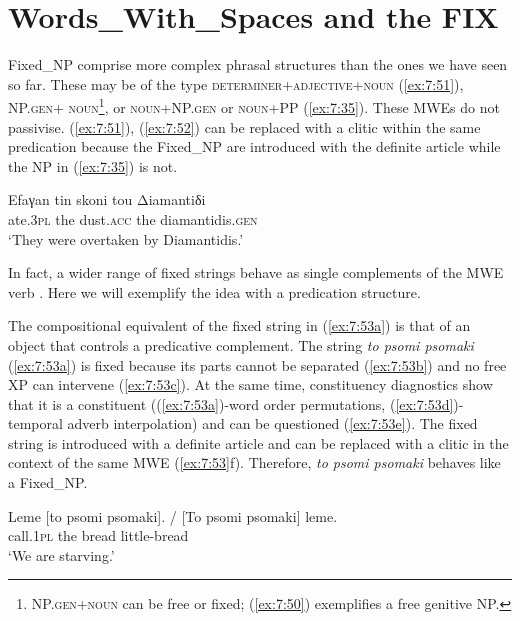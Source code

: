 \documentclass[output=paper]{langsci/langscibook}
\begin{document}
\section{Words\_With\_Spaces and the FIX}
\label{sec:6}
Fixed\_NP comprise more complex phrasal structures than the ones we have seen so far. These may  be of the type \textsc{determiner+adjective+noun}  (\ref{ex:7:51}), \textsc{NP.gen+} \textsc{noun}\footnote{\textsc{NP.gen+noun} can be free or fixed; (\ref{ex:7:50}) exemplifies a free genitive NP.}, or \textsc{noun+NP.gen} 
or \textsc{noun+PP} (\ref{ex:7:35}).  These MWEs do not passivise. (\ref{ex:7:51}), (\ref{ex:7:52}) can be replaced with a clitic within the same predication because the \linebreak Fixed\_NP are introduced with the definite article while the NP in (\ref{ex:7:35}) is not. 

\ea
\label{ex:7:52}      
\gll        Efaγan tin skoni tou Δiamantiδi\\
             ate.\textsc{3pl} the dust.\textsc{acc} the diamantidis.\textsc{gen}\\
\glt         `They were overtaken by Diamantidis.'
\z


In fact, a wider range of fixed strings behave as single complements of the MWE verb \citep{Samaridi:Markantonatou:14}. Here we will exemplify the idea with a predication structure. 

The compositional equivalent of the fixed string in (\ref{ex:7:53a}) is that of an object that controls a predicative complement. The string  {\normalfont \itshape to psomi psomaki} (\ref{ex:7:53a}) is fixed because its parts cannot be separated (\ref{ex:7:53b}) and no free XP can intervene (\ref{ex:7:53c}). At the same time, constituency diagnostics show that it is a constituent ((\ref{ex:7:53a})-word order permutations, (\ref{ex:7:53d})-temporal adverb interpolation) and can be questioned (\ref{ex:7:53e}).  The fixed string is introduced with a definite article and can be replaced with a clitic in the context of the same MWE (\ref{ex:7:53}f). Therefore, {\normalfont \itshape to psomi psomaki} behaves like a Fixed\_NP. 

\ea\label{ex:7:53}
\ea \label{ex:7:53a}
\gll  Leme [to psomi psomaki]. / [To psomi psomaki] leme. \\
               call.\textsc{1pl} the bread little-bread\\
\glt           `We are starving.'
\end{document}

